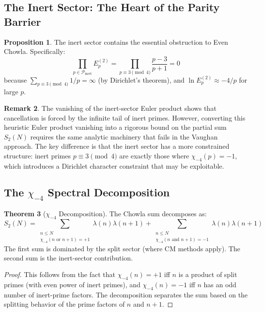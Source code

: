 \documentclass[11pt,a4paper]{article}
\theoremstyle{definition}
\newtheorem{theorem}{Theorem}[section]
\newtheorem{proposition}[theorem]{Proposition}
\newtheorem{remark}[theorem]{Remark}
\begin{document}
\subsection{The Inert Sector: The Heart of the Parity Barrier}

\begin{proposition}
\label{prop:inert-barrier}
The inert sector contains the essential obstruction to Even Chowla. Specifically:
\begin{equation}
\prod_{p \in \mathcal{P}_{\mathrm{inert}}} E_p^{(2)} = \prod_{p \equiv 3 \pmod{4}} \frac{p-3}{p+1} = 0
\end{equation}
because $\sum_{p \equiv 3 \pmod{4}} 1/p = \infty$ (by Dirichlet's theorem), and $\ln E_p^{(2)} \approx -4/p$ for large $p$.
\end{proposition}

\begin{remark}
The vanishing of the inert-sector Euler product shows that cancellation is forced by the infinite tail of inert primes. However, converting this heuristic Euler product vanishing into a rigorous bound on the partial sum $S_2(N)$ requires the same analytic machinery that fails in the Vaughan approach. The key difference is that the inert sector has a more constrained structure: inert primes $p \equiv 3 \pmod 4$ are exactly those where $\chi_{-4}(p) = -1$, which introduces a Dirichlet character constraint that may be exploitable.
\end{remark}

\subsection{The $\chi_{-4}$ Spectral Decomposition}

\begin{theorem}[$\chi_{-4}$ Decomposition]
\label{thm:chi-decomp}
The Chowla sum decomposes as:
\begin{equation}
S_2(N) = \sum_{\substack{n \le N \\ \chi_{-4}(n \text{ or } n+1) = +1}} \lambda(n)\lambda(n+1) + \sum_{\substack{n \le N \\ \chi_{-4}(n \text{ and } n+1) = -1}} \lambda(n)\lambda(n+1)
\end{equation}
The first sum is dominated by the split sector (where CM methods apply). The second sum is the inert-sector contribution.
\end{theorem}

\begin{proof}
This follows from the fact that $\chi_{-4}(n) = +1$ iff $n$ is a product of split primes (with even power of inert primes), and $\chi_{-4}(n) = -1$ iff $n$ has an odd number of inert-prime factors. The decomposition separates the sum based on the splitting behavior of the prime factors of $n$ and $n+1$.
\end{proof}
\end{document}
